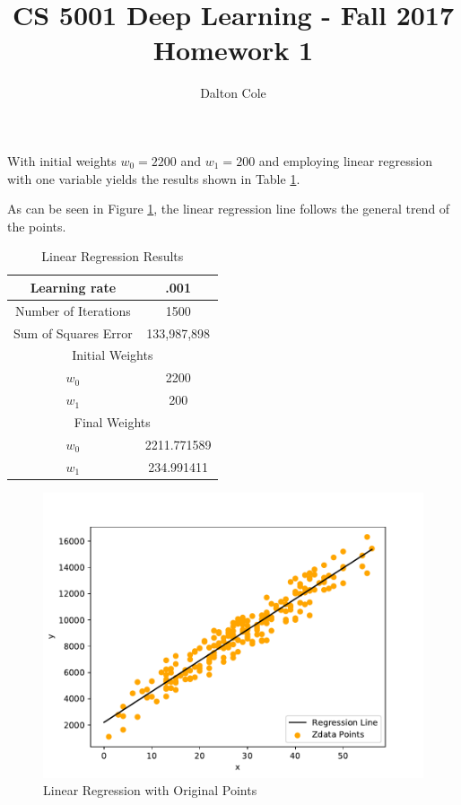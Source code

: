 \documentclass[times]{article}
\begin{document}
	\title{CS 5001 Deep Learning - Fall 2017 \\ Homework 1}
	\author{Dalton Cole}
	\date{}
	\maketitle

	With initial weights $w_0 = 2200$ and $w_1 = 200$ and employing linear regression with one variable yields the results shown in Table \ref{tab:results}.

	As can be seen in Figure \ref{fig:plot}, the linear regression line follows the general trend of the points.

	\begin{table}
		\centering
		\caption{Linear Regression Results}
		\label{tab:results}
		\begin{tabular}{| c | c |}
			\hline
			Learning rate & .001 \\
			\hline
			Number of Iterations & 1500 \\
			\hline
			Sum of Squares Error & 133,987,898 \\
			\hline
			\multicolumn{2}{|c|}{Initial Weights} \\
			\hline
			$w_0$ & 2200 \\
			\hline
			$w_1$ & 200 \\
			\hline
			\multicolumn{2}{|c|}{Final Weights} \\
			\hline
			$w_0$ & 2211.771589 \\
			\hline
			$w_1$ & 234.991411 \\
			\hline
		\end{tabular}
	\end{table}
	

	\begin{figure}
		\caption{Linear Regression with Original Points}
		\label{fig:plot}
		\includegraphics[width=\textwidth]{plot.pdf}
	\end{figure}

	
		
\end{document}
